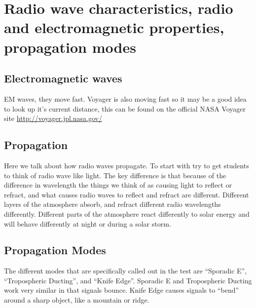 \documentclass[12pt,letterpaper]{report}
\begin{document}
\section*{Radio wave characteristics, radio and electromagnetic properties, propagation modes}

\subsection*{Electromagnetic waves}
EM waves, they move fast. Voyager is also moving fast so it may be a good idea to look up it's current distance, this can be found on the official NASA Voyager site \url{http://voyager.jpl.nasa.gov/}

\subsection*{Propagation}
Here we talk about how radio waves propagate. To start with try to get students to think of radio wave like light. The key difference is that because of the difference in wavelength the things we think of as causing light to reflect or refract, and what causes radio waves to reflect and refract are different. Different layers of the atmosphere absorb, and refract different radio wavelengths differently. Different parts of the atmosphere react differently to solar energy and will behave differently at night or during a solar storm. 

\subsection*{Propagation Modes}
The different modes that are specifically called out in the test are ``Sporadic E'', ``Tropospheric Ducting'', and ``Knife Edge''. Sporadic E and Tropospheric Ducting work very similar in that signals bounce. Knife Edge causes signals to ``bend'' around a sharp object, like a mountain or ridge.
\end{document}
